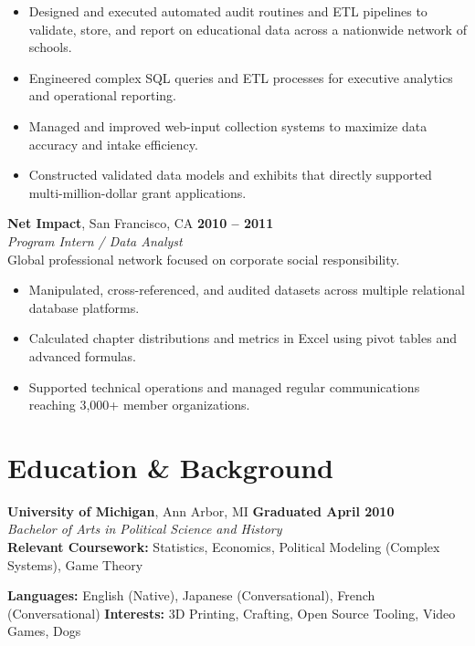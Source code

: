 \documentclass[10pt,letterpaper]{article}
\begin{document}
\begin{itemize}[leftmargin=1.2em, itemsep=1.5pt, topsep=2pt]
    \item Designed and executed automated audit routines and ETL pipelines to validate, store, and report on educational data across a nationwide network of schools.
    \item Engineered complex SQL queries and ETL processes for executive analytics and operational reporting.
    \item Managed and improved web-input collection systems to maximize data accuracy and intake efficiency.
    \item Constructed validated data models and exhibits that directly supported multi-million-dollar grant applications.
\end{itemize}
\vspace{0.4em}
\noindent
\textbf{Net Impact}, San Francisco, CA \hfill \textbf{2010 -- 2011}\\
\textit{Program Intern / Data Analyst} \\
{\footnotesize \color{mutedtext} Global professional network focused on corporate social responsibility.}\\[0.2em]
\begin{itemize}[leftmargin=1.2em, itemsep=1.5pt, topsep=2pt]
    \item Manipulated, cross-referenced, and audited datasets across multiple relational database platforms.
    \item Calculated chapter distributions and metrics in Excel using pivot tables and advanced formulas.
    \item Supported technical operations and managed regular communications reaching 3,000+ member organizations.
\end{itemize}
\vspace{0.4em}

\section*{Education \& Background}
\small
\noindent
\textbf{University of Michigan}, Ann Arbor, MI \hfill \textbf{Graduated April 2010}\\
\textit{Bachelor of Arts in Political Science and History}\\[0.2em]
\textbf{Relevant Coursework:} Statistics, Economics, Political Modeling (Complex Systems), Game Theory

\vspace{0.6em}
\noindent
\textbf{Languages:} English (Native), Japanese (Conversational), French (Conversational) \hfill
\textbf{Interests:} 3D Printing, Crafting, Open Source Tooling, Video Games, Dogs
\end{document}
